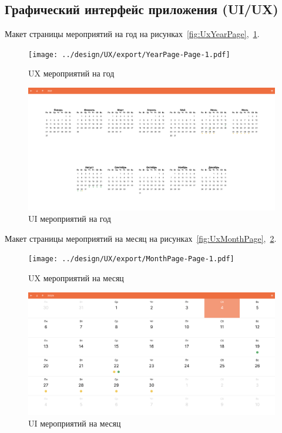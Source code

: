 \newpage
\subsection{Графический интерфейс приложения (UI/UX)}

Макет страницы мероприятий на год на рисунках~\ref{fig:UxYearPage},~\ref{fig:UiYearPage}.

\begin{figure}[!h]
  \centering
  \begin{minipage}{0.32\textwidth}
    \centering
    \texttt{[image: ../design/UX/export/YearPage-Page-1.pdf]}
    \caption{UX мероприятий на год}
    \label{fig:UxYearPage}
  \end{minipage}
  \begin{minipage}{0.66\textwidth}
    \centering
    \includegraphics[width=0.99\textwidth]
    {images/screenshots/YearPage.png}
    \caption{UI мероприятий на год}
    \label{fig:UiYearPage}
  \end{minipage}
\end{figure}

Макет страницы мероприятий на месяц на рисунках~\ref{fig:UxMonthPage},~\ref{fig:UiMonthPage}.

\begin{figure}[!h]
  \centering
  \begin{minipage}{0.32\textwidth}
    \centering
    \texttt{[image: ../design/UX/export/MonthPage-Page-1.pdf]}
    \caption{UX мероприятий на месяц}
    \label{fig:UxMonthPage}
  \end{minipage}
  \begin{minipage}{0.66\textwidth}
    \centering
    \includegraphics[width=0.99\textwidth]
    {images/screenshots/MonthPage.png}
    \caption{UI мероприятий на месяц}
    \label{fig:UiMonthPage}
  \end{minipage}
\end{figure}


